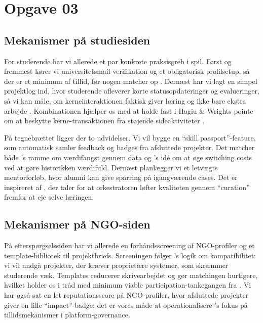 \section*{Opgave 03}

\subsection*{Mekanismer på studiesiden}
For studerende har vi allerede et par konkrete praksisgreb i spil. Først og fremmest kører vi universitetsmail-verifikation og et obligatorisk profilsetup, så der er et minimum af tillid, før nogen matcher op \citep{Choudary2016}. Dernæst har vi lagt en simpel projektlog ind, hvor studerende afleverer korte statusopdateringer og evalueringer, så vi kan måle, om kerneinteraktionen faktisk giver læring og ikke bare ekstra arbejde \citep{Reillier2017}. Kombinationen hjælper os med at holde fast i Hagiu \& Wrights pointe om at beskytte kerne-transaktionen fra støjende sideaktiviteter \citep{HagiuWright2013}.

På tegnebrættet ligger der to udvidelser. Vi vil bygge en ``skill passport''-feature, som automatisk samler feedback og badges fra afsluttede projekter. Det matcher både \citet{Choudary2016}'s ramme om værdifangst gennem data og \citet{ShapiroVarian1999}'s idé om at øge switching costs ved at gøre historikken værdifuld. Dernæst planlægger vi et letvægts mentorforløb, hvor alumni kan give sparring på igangværende cases. Det er inspireret af \citet{Reillier2017}, der taler for at orkestratoren løfter kvaliteten gennem ``curation'' fremfor at eje selve læringen.

\subsection*{Mekanismer på NGO-siden}
På efterspørgselssiden har vi allerede en forhåndsscreening af NGO-profiler og et template-bibliotek til projektbriefs. Screeningen følger \citet{FarrellSaloner1986}'s logik om kompatibilitet: vi vil undgå projekter, der kræver proprietære systemer, som skræmmer studerende væk. Templates reducerer skrivearbejdet og gør matchingen hurtigere, hvilket holder os i tråd med minimum viable participation-tankegangen fra \citet{Reillier2017}. Vi har også sat en let reputationsscore på NGO-profiler, hvor afsluttede projekter giver en lille ``impact''-badge; det er vores måde at operationalisere \citet{Choudary2016}'s fokus på tillidsmekanismer i platform-governance.

